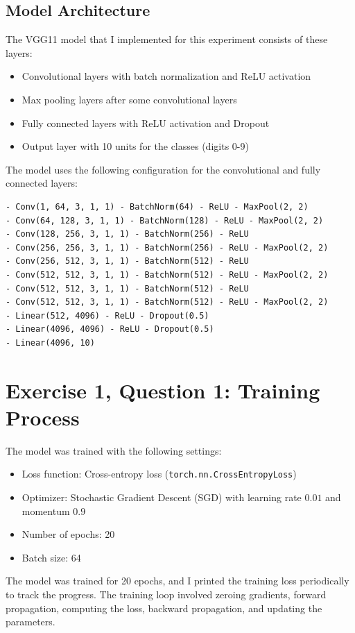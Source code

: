 \documentclass[10pt,letter,notitlepage]{article}
\begin{document}
\begin{center}
\subsection{Model Architecture}
The VGG11 model that I implemented for this experiment consists of these layers:
\begin{itemize}
    \item Convolutional layers with batch normalization and ReLU activation
    \item Max pooling layers after some convolutional layers
    \item Fully connected layers with ReLU activation and Dropout
    \item Output layer with 10 units for the classes (digits 0-9)
\end{itemize}

The model uses the following configuration for the convolutional and fully connected layers:
\begin{verbatim}
- Conv(1, 64, 3, 1, 1) - BatchNorm(64) - ReLU - MaxPool(2, 2)
- Conv(64, 128, 3, 1, 1) - BatchNorm(128) - ReLU - MaxPool(2, 2)
- Conv(128, 256, 3, 1, 1) - BatchNorm(256) - ReLU
- Conv(256, 256, 3, 1, 1) - BatchNorm(256) - ReLU - MaxPool(2, 2)
- Conv(256, 512, 3, 1, 1) - BatchNorm(512) - ReLU
- Conv(512, 512, 3, 1, 1) - BatchNorm(512) - ReLU - MaxPool(2, 2)
- Conv(512, 512, 3, 1, 1) - BatchNorm(512) - ReLU
- Conv(512, 512, 3, 1, 1) - BatchNorm(512) - ReLU - MaxPool(2, 2)
- Linear(512, 4096) - ReLU - Dropout(0.5)
- Linear(4096, 4096) - ReLU - Dropout(0.5)
- Linear(4096, 10)
\end{verbatim}

\section{Exercise 1, Question 1: Training Process}
The model was trained with the following settings:
\begin{itemize}
    \item Loss function: Cross-entropy loss (\texttt{torch.nn.CrossEntropyLoss})
    \item Optimizer: Stochastic Gradient Descent (SGD) with learning rate $0.01$ and momentum $0.9$
    \item Number of epochs: 20
    \item Batch size: 64
\end{itemize}

The model was trained for 20 epochs, and I printed the training loss periodically to track the progress. The training loop involved zeroing gradients, forward propagation, computing the loss, backward propagation, and updating the parameters.


\end{center}
\end{document}
